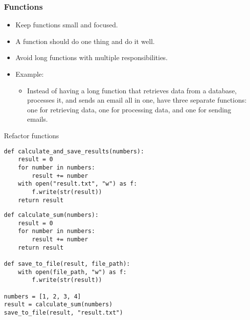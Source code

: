 \documentclass{beamer}
\begin{document}
\begin{frame}[fragile]
\frametitle{Functions}

\begin{itemize}
\item Keep functions small and focused.
\item A function should do one thing and do it well. 
\item Avoid long functions with multiple responsibilities.
\item Example:
\begin{itemize}
\item Instead of having a long function that retrieves data from a database, processes it, and sends an email all in one, have three separate functions: one for retrieving data, one for processing data, and one for sending emails.
\end{itemize}
\end{itemize}
\end{frame}

\begin{frame}[fragile]{Refactor functions}
\begin{lstlisting}[style=Python]
def calculate_and_save_results(numbers):
    result = 0
    for number in numbers:
        result += number
    with open("result.txt", "w") as f:
        f.write(str(result))
    return result
\end{lstlisting}

\vspace{-\baselineskip}

\hrulefill

\vspace{-.2\baselineskip}

\begin{lstlisting}[style=Python]
def calculate_sum(numbers):
    result = 0
    for number in numbers:
        result += number
    return result

def save_to_file(result, file_path):
    with open(file_path, "w") as f:
        f.write(str(result))

numbers = [1, 2, 3, 4]
result = calculate_sum(numbers)
save_to_file(result, "result.txt")
\end{lstlisting}
\end{frame}
\end{document}
